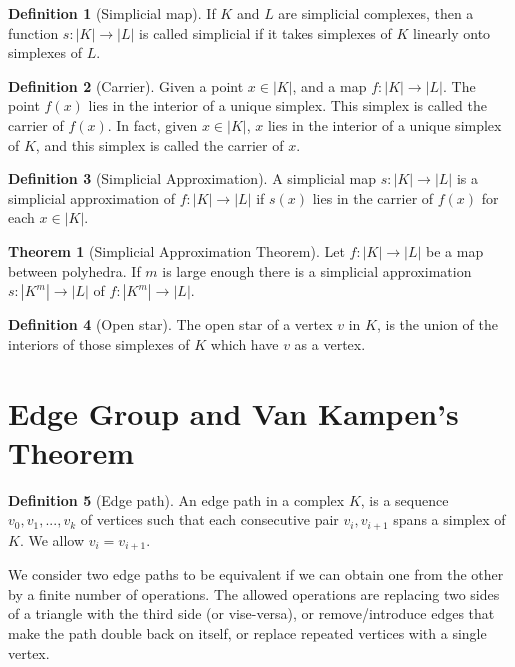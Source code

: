 \documentclass{article}
\theoremstyle{definition}
\newtheorem{definition}{Definition}[section]
\newtheorem{theorem}{Theorem}[section]
\theoremstyle{remark}
\theoremstyle{remark}
\begin{document}
\begin{definition}[Simplicial map]
    If $K$ and $L$ are simplicial complexes, then a function $s: |K| \to |L|$ is called simplicial if it takes simplexes of $K$ linearly onto simplexes of $L$.
\end{definition}

\begin{definition}[Carrier]
    Given a point $x \in |K|$, and a map $f: |K| \to |L|$. The point $f(x)$ lies in the interior of a unique simplex. This simplex is called the carrier of $f(x)$. In fact, given $x \in |K|$, $x$ lies in the interior of a unique simplex of $K$, and this simplex is called the carrier of $x$.
\end{definition}

\begin{definition}[Simplicial Approximation]
    A simplicial map $s: |K| \to |L|$ is a simplicial approximation of $f: |K| \to |L|$ if $s(x)$ lies in the carrier of $f(x)$ for each $x \in |K|$.
\end{definition}

\begin{theorem}[Simplicial Approximation Theorem]
    Let $f: |K| \to |L|$ be a map between polyhedra. If $m$ is large enough there is a simplicial approximation $s: |K^m| \to |L|$ of $f: |K^m| \to |L|$. 
\end{theorem}

\begin{definition}[Open star]
    The open star of a vertex $v$ in $K$, is the union of the interiors of those simplexes of $K$ which have $v$ as a vertex.
\end{definition}

\section{Edge Group and Van Kampen's Theorem}

\begin{definition}[Edge path]
    An edge path in a complex $K$, is a sequence $v_0, v_1, ..., v_k$ of vertices such that each consecutive pair $v_i, v_{i+1}$ spans a simplex of $K$. We allow $v_i = v_{i+1}$.

    We consider two edge paths to be equivalent if we can obtain one from the other by a finite number of operations. The allowed operations are replacing two sides of a triangle with the third side (or vise-versa), or remove/introduce edges that make the path double back on itself, or replace repeated vertices with a single vertex. 
\end{definition}
\end{document}
